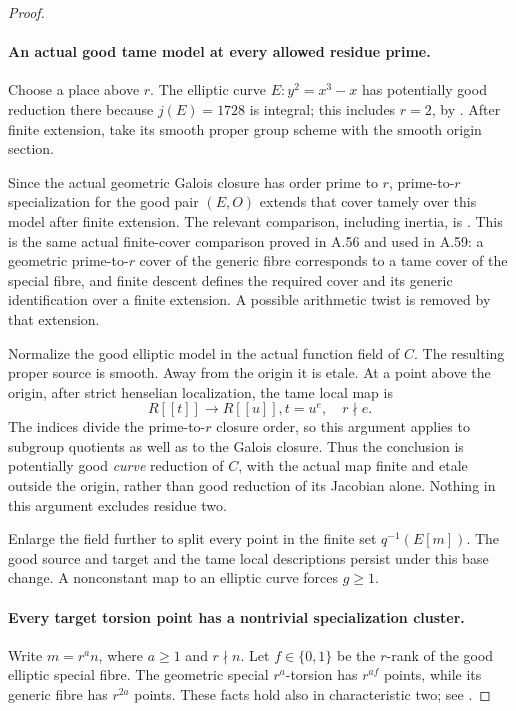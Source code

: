 \begin{proof}
\paragraph{An actual good tame model at every allowed residue prime.}
Choose a place above \(r\). The elliptic curve
\(E:y^2=x^3-x\) has potentially good reduction there
because \(j(E)=1728\) is integral; this includes
\(r=2\), by \cite[Proposition VII.5.5, p.197,
and Appendix A.1.4(b)]{fghSilvermanAEC}.
After finite extension, take its smooth proper group
scheme with the smooth origin section.

Since the actual geometric Galois closure has order
prime to \(r\), prime-to-\(r\) specialization for
the good pair \((E,O)\) extends that cover tamely
over this model after finite extension. The relevant
comparison, including inertia, is
\cite[Expos\'e XIII, Corollary 2.9, Section 2.10 and
the proof of Corollary 2.12]{fghSGA1}. This is the
same actual finite-cover comparison proved in A.56
and used in A.59: a geometric prime-to-\(r\)
cover of the generic fibre corresponds to a tame
cover of the special fibre, and finite descent
defines the required cover and its generic
identification over a finite extension. A possible
arithmetic twist is removed by that extension.

Normalize the good elliptic model in the actual
function field of \(C\). The resulting proper
source is smooth. Away from the origin it is
etale. At a point above the origin, after strict
henselian localization, the tame local map is
\[
                    R[[t]]\longrightarrow R[[u]],
                              t=u^e,\quad r\nmid e.
                                                        \tag{A.64.3}
\]
The indices divide the prime-to-\(r\) closure
order, so this argument applies to subgroup
quotients as well as to the Galois closure.
Thus the conclusion is potentially good
\emph{curve} reduction of \(C\), with the actual
map finite and etale outside the origin, rather
than good reduction of its Jacobian alone.
Nothing in this argument excludes residue two.

Enlarge the field further to split every point
in the finite set \(q^{-1}(E[m])\). The good
source and target and the tame local descriptions
persist under this base change. A nonconstant map
to an elliptic curve forces \(g\ge1\).

\paragraph{Every target torsion point has a nontrivial specialization cluster.}
Write \(m=r^a n\), where \(a\ge1\) and \(r\nmid n\).
Let \(f\in\{0,1\}\) be the \(r\)-rank of the good
elliptic special fibre. The geometric special
\(r^a\)-torsion has \(r^{af}\) points, while its
generic fibre has \(r^{2a}\) points. These facts
hold also in characteristic two; see
\cite[Theorem V.3.1, p.145]{fghSilvermanAEC}.


\end{proof}
